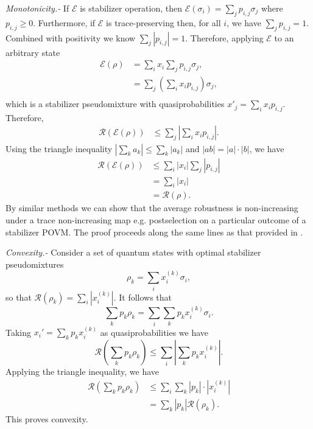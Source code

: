 \documentclass[aps,prl,twocolumn,showpacs,superscriptaddress,groupedaddress,amsmath,amssymb]{revtex4-1}  %
\begin{document}
\noindent\textit{Monotonicity.-} If $\mathcal{E}$ is stabilizer operation, then $\mathcal{E}(\sigma_i)=\sum_{j} p_{i,j} \sigma_j$ where $p_{i,j} \geq 0$.  Furthermore, if $\mathcal{E}$ is trace-preserving  then, for all $i$, we have $\sum_{j} p_{i,j}= 1$.  Combined with positivity we know  $\sum_{j} |p_{i,j}| = 1$.  Therefore, applying $\mathcal{E}$ to an arbitrary state
\begin{align}
	\mathcal{E} ( \rho ) & = \sum_{i} x_i  \sum_{j} p_{i,j}  \sigma_j,	\\ \nonumber
& = \sum_{j}  \left( \sum_{i} x_i p_{i,j} \right)  \sigma_j,	\\ \nonumber
\end{align}
which is a stabilizer pseudomixture with quasiprobabilities $x'_j=\sum_{i} x_i p_{i,j}$.  Therefore,
 \begin{align}
	\mathcal{R} \left(\mathcal{E} \left(  \rho \right) \right)& \leq  \sum_{j} |\sum_i x_i p_{i,j} | .
\end{align}
Using the triangle inequality $|\sum_k a_k| \leq  \sum_k |a_k|$ and $|ab|=|a|\cdot|b|$, we have 
\begin{align}
	\mathcal{R} \left(\mathcal{E} \left(  \rho \right) \right) & \leq \sum_i |x_i|  \sum_{j} |p_{i,j} | \\ \nonumber
& = \sum_i |x_i| \\ \nonumber
& = \mathcal{R} \left( \rho \right) . 
\end{align}
By similar methods we can show that the average robustness is non-increasing under a trace non-increasing map e.g. postselection on a particular outcome of a stabilizer POVM. The proof proceeds along the same lines as that provided in \cite{vidal_robustness_1999}.


\noindent\textit{Convexity.-} Consider a set of quantum states with optimal stabilizer pseudomixtures 
\begin{equation}
		\rho_k = \sum_i x_{i}^{(k)} \sigma_i,
\end{equation}
so that $\mathcal{R}( \rho_k  )=\sum_i | x_{i}^{(k)} |$. It follows that
\begin{equation}
	\sum_k p_k \rho_k = \sum_i \sum_k p_k x_i^{(k)} \sigma_i .
\end{equation}
Taking $x_i' = \sum_k p_k x_i^{(k)}$ as quasiprobabilities we have
\begin{equation}
	\mathcal{R} \left( \sum_k p_k \rho_k \right) \leq \sum_i |\sum_k p_k x_i^{(k)}| .
\end{equation}
Applying the triangle inequality, we have
\begin{align}
	\mathcal{R} \left( \sum_k p_k \rho_k \right) & \leq \sum_i \sum_k |p_k|\cdot | x_i^{(k)}| \\ \nonumber
& = \sum_k |p_k| \mathcal{R}( \rho_k  ).
\end{align}
This proves convexity.
\end{document}
